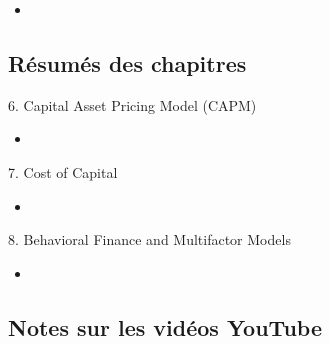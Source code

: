 \begin{YTB_vids}
\begin{itemize}
	\item	
\end{itemize}
\end{YTB_vids}

\subsection{Résumés des chapitres}

\begin{CHPT_SUMM_AUTO}[label = {L.-6}]{6. Capital Asset Pricing Model (CAPM)}
	\begin{itemize}
		\item	
	\end{itemize}
\end{CHPT_SUMM_AUTO}

\begin{CHPT_SUMM_AUTO}[label = {L.-7}]{7. Cost of Capital}
	\begin{itemize}
		\item	
	\end{itemize}
\end{CHPT_SUMM_AUTO}

\begin{CHPT_SUMM_AUTO}[label = {L.-8}]{8. Behavioral Finance and Multifactor Models}
	\begin{itemize}
		\item	
	\end{itemize}
\end{CHPT_SUMM_AUTO}

\subsection{Notes sur les vidéos YouTube}


